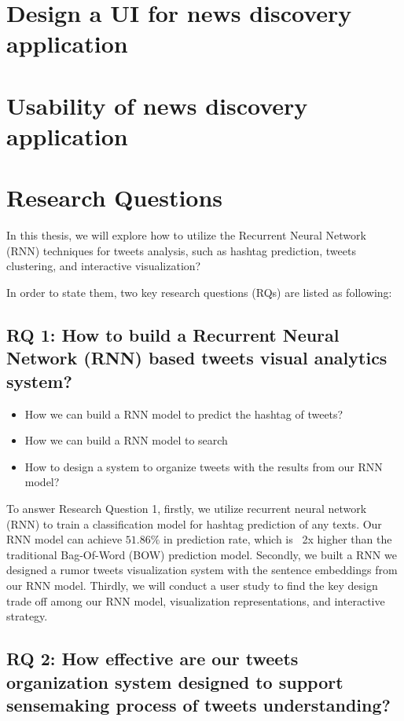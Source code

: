 \section{Design a UI for news discovery application}

\section{Usability of news discovery application}

\section{Research Questions}

In this thesis, we will explore how to utilize the Recurrent Neural Network (RNN) techniques for tweets analysis, such as hashtag prediction, tweets clustering, and interactive visualization?



In order to state them, two key research questions (RQs) are listed as following: 

\subsection{RQ 1: How to build a Recurrent Neural Network (RNN) based tweets visual analytics system?}

\begin{itemize}
    \item How we can build a RNN model to predict the hashtag of tweets?
    \item How we can build a RNN model to search 
    \item How to design a system to organize tweets with the results from our RNN model? 

\end{itemize}

To answer Research Question 1,  firstly, we utilize recurrent neural network (RNN) to train a classification model for hashtag prediction of any texts. Our RNN model can achieve $51.86\%$ in prediction rate, which is ~2x higher than the traditional Bag-Of-Word (BOW) prediction model. Secondly, we built a RNN we designed a rumor tweets visualization system with the sentence embeddings from our RNN model. Thirdly, we will conduct a user study to find the key design trade off among our RNN model, visualization representations, and interactive strategy.

    
\subsection{RQ 2: How effective are our tweets organization system designed to support sensemaking process of tweets  understanding? }

